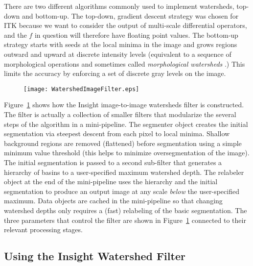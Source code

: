 There are two different algorithms commonly used to implement watersheds,
top-down and bottom-up.  The top-down, gradient descent strategy was chosen for
ITK because we want to consider the output of multi-scale differential
operators, and the $f$ in question will therefore have floating point
values. The bottom-up strategy starts with seeds at the local minima in the
image and grows regions outward and upward at discrete intensity levels
(equivalent to a sequence of morphological operations and sometimes called {\em
morphological watersheds} \cite{Serra1982}.) This limits the accuracy by
enforcing a set of discrete gray levels on the image.

\begin{figure}
\centering
\texttt{[image: WatershedImageFilter.eps]}
\protect\label{fig:constructionWatersheds}
\end{figure}

Figure~\ref{fig:constructionWatersheds} shows how the Insight
image-to-image watersheds filter is constructed.  The filter is
actually a collection of smaller filters that modularize the several
steps of the algorithm in a mini-pipeline.  The segmenter object
creates the initial segmentation via steepest descent from each pixel
to local minima. Shallow background regions are removed (flattened)
before segmentation using a simple minimum value threshold (this helps
to minimize oversegmentation of the image).  The initial segmentation
is passed to a second sub-filter that generates a hierarchy of basins
to a user-specified maximum watershed depth.  The relabeler object at
the end of the mini-pipeline uses the hierarchy and the initial
segmentation to produce an output image at any scale {\em below} the
user-specified maximum.  Data objects are cached in the mini-pipeline
so that changing watershed depths only requires a (fast) relabeling of
the basic segmentation.  The three parameters that control the filter
are shown in Figure~\ref{fig:constructionWatersheds} connected to
their relevant processing stages.

\subsection{Using the Insight Watershed Filter}
\label{sec:UsingWatersheds}



